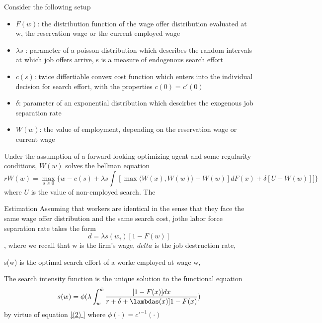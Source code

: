 \documentclass{article}
\begin{document}
Consider the following setup
\begin{itemize}
    \item $F(w)$: the distribution function of the wage offer distribution evaluated at w, the reservation wage or the current employed wage
    \item $\lambda s$ : parameter of a poisson distribution which describes the random intervals at which job offers arrive, s is a measure of endogenous search effort
    \item $c(s)$: twice differtiable convex cost function which enters into the individual decision for search effort, with the properties $c(0)=c'(0)$
    \item $\delta$: parameter of an exponential distribution which descirbes the exogenous job separation rate
    \item $W(w)$: the value of employment, depending on the reservation wage or current wage
\end{itemize}
Under the assumption of a forward-looking optimizing agent and some regularity conditions, $W(w)$ solves the bellman equation
\begin{equation}
    r W(w) = \max_{s \geq 0} \{ w - c(s) + \lambda s \int [ \max \langle W(x), W(w) \rangle  - W(w) ] dF(x) + \delta [ U - W(w)] ] \}
\end{equation}
where $U$ is the value of non-employed search. 
The 







Estimation 
Assuming that workers are identical in the sense that they face the same wage offer distribution and the same search cost, jothe labor force separation rate takes the form 
\begin{equation}
    d = \lambda s (w_i)[ 1 - F(w)]
\end{equation}
, where we recall that w is the firm's wage, $delta$ is the job destruction rate, 

s(w) is the optimal search effort of a worke employed at wage w, 

The search intensity function is the unique solution to the functional equation
\begin{equation}
    s(w) = \phi ( \lambda \int_w ^ {\bar{w}}  \frac{ [1- F(x)]dx}{ r + \delta + \lambdas(x)] 1 - F(x)}) 
\end{equation}
by virtue of equation \ref{(2) } where $\phi(\cdot)= c'^{-1}(\cdot)$ 
\end{document}
